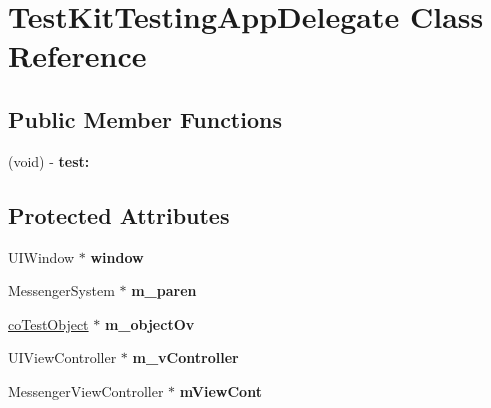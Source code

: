 \hypertarget{interface_test_kit_testing_app_delegate}{
\section{TestKitTestingAppDelegate Class Reference}
\label{interface_test_kit_testing_app_delegate}
}
\subsection*{Public Member Functions}
\begin{DoxyCompactItemize}
\item 
\hypertarget{interface_test_kit_testing_app_delegate_a2e135f1303a4ba57f86c4ba41da47f4f}{
(void) -\/ {\bfseries test:}}
\label{interface_test_kit_testing_app_delegate_a2e135f1303a4ba57f86c4ba41da47f4f}

\end{DoxyCompactItemize}
\subsection*{Protected Attributes}
\begin{DoxyCompactItemize}
\item 
\hypertarget{interface_test_kit_testing_app_delegate_aec99e2c5d9fac56148a9dd082c243475}{
UIWindow $\ast$ {\bfseries window}}
\label{interface_test_kit_testing_app_delegate_aec99e2c5d9fac56148a9dd082c243475}

\item 
\hypertarget{interface_test_kit_testing_app_delegate_a7bd2ccd2b6b950bc3e999d2fafb006e7}{
MessengerSystem $\ast$ {\bfseries m\_\-paren}}
\label{interface_test_kit_testing_app_delegate_a7bd2ccd2b6b950bc3e999d2fafb006e7}

\item 
\hypertarget{interface_test_kit_testing_app_delegate_acef5266e4bf9e012a652a87aba9d96ce}{
\hyperlink{interfaceco_test_object}{coTestObject} $\ast$ {\bfseries m\_\-objectOv}}
\label{interface_test_kit_testing_app_delegate_acef5266e4bf9e012a652a87aba9d96ce}

\item 
\hypertarget{interface_test_kit_testing_app_delegate_aab33b8be351c273c0e70c45c12e1631f}{
UIViewController $\ast$ {\bfseries m\_\-vController}}
\label{interface_test_kit_testing_app_delegate_aab33b8be351c273c0e70c45c12e1631f}

\item 
\hypertarget{interface_test_kit_testing_app_delegate_af97dad4dbb1b81f708a107234c9b7cbb}{
MessengerViewController $\ast$ {\bfseries mViewCont}}
\label{interface_test_kit_testing_app_delegate_af97dad4dbb1b81f708a107234c9b7cbb}

\end{DoxyCompactItemize}
